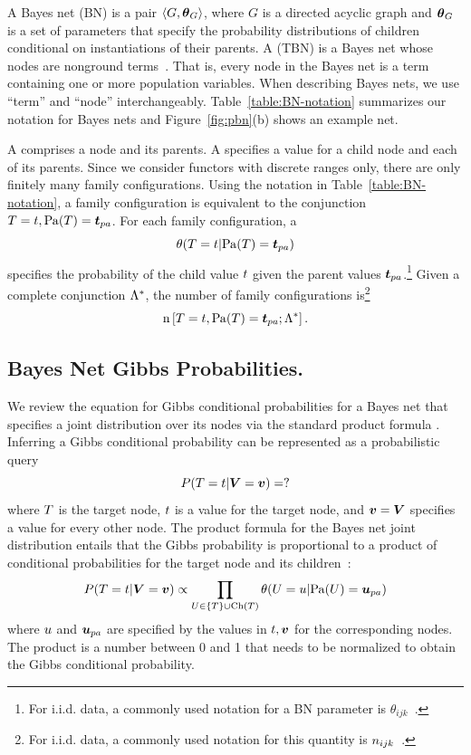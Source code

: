 \documentclass[runningheads,a4paper]{llncs}
\newcommand{\iid}{i.i.d.}
\begin{document}
A Bayes net (BN) is a pair
$\langle{G,\boldsymbol{\theta}_G}\rangle$, where $G$ is a directed acyclic graph and $\boldsymbol{\theta}_G$ is a set of parameters that specify the  probability distributions of children conditional on instantiations of their parents. A  (TBN) is a Bayes net whose nodes are nonground terms~\cite{Poole2003,Schulte2011}. That is, every node in the Bayes net is a term containing one or more population variables. When describing Bayes nets, we use ``term'' and ``node'' interchangeably. Table~\ref{table:BN-notation} summarizes our notation for Bayes nets and Figure~\ref{fig:pbn}(b) shows an example net.

A  comprises a node and its parents. A  specifies a value for a child node and each of its parents. Since we consider functors with discrete ranges only, there are only finitely many family configurations. Using the notation in Table~\ref{table:BN-notation}, a family configuration is equivalent to the conjunction $\TT=\TV,\Pa{\TT} = \Prange{\TT}$. For each family configuration, a  $$\cprob{\TT = \TV}{\Pa{\TT} = \Prange{\TT}}$$ specifies the probability of the child value $t$ given the parent values $\Prange{\TT}$.\footnote{For \iid{} data, a commonly  used notation for a BN parameter is $\theta_{ijk}$~\cite{Heckerman1998}.} Given a complete conjunction $\Lambda^{*}\hspace{0.0ex}$, the number of family configurations is\footnote{For \iid{} data, a commonly  used notation for this quantity is $n_{ijk}$~\cite{Heckerman1998}.} $$\Count{\TT=\TV,\Pa{\TT} = \Prange{\TT}}{\DB}.$$



\subsection{Bayes Net Gibbs Probabilities.}

We review the equation for Gibbs conditional probabilities for a Bayes net that specifies a joint distribution over its nodes via the standard product formula \cite{Pearl1988}. 
Inferring a Gibbs conditional probability can be represented as a probabilistic query
$$\Gprob{\TT = \TV} {\VF = \VTuple} = ?$$
\noindent where $T$ is the target node, $t$ is a value for the target node, and $\VTuple = \VF$ specifies a value for every other node. The product formula for the Bayes net joint distribution entails that the Gibbs probability is proportional to a product of conditional probabilities for the target node and its children~\cite[Ch.14.5.2]{Russell2010}:  
\begin{equation} \label{eq:bn-mb-product}
\Gprob{\TT = \TV} {\VF = \VTuple} \propto \prod_{\UT \in \{\TT\} \cup \Ch{\TT}} \cprob{\UT = \UV}{\Pa{\UT} = \Prange{\UT}}
\end{equation}
where $u$ and $\Prange{\UT}$ are specified by the values in $\TV,\VTuple$ for the corresponding nodes. The product is a number between 0 and 1 that needs to be normalized to obtain the Gibbs conditional probability.
\end{document}
